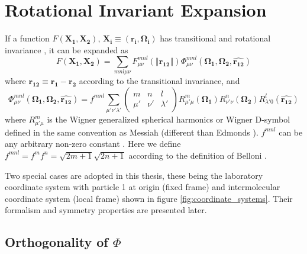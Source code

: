 
\chapter{Rotational Invariant Expansion\label{chpt:rotational-invariant-expansion}}

If a function $F(\mathbf{X_{1}},\mathbf{X_{2}})$, $\mathbf{X_{i}}\equiv(\mathbf{r_{i}},\mathbf{\Omega_{i}})$
has transitional and rotational invariance \citep{Blum_I}, it can
be expanded as
\begin{equation}
F(\mathbf{X_{1}},\mathbf{X_{2}})=\sum_{mnl\mu\nu}F_{\mu\nu}^{mnl}(\left\Vert \mathbf{r_{12}}\right\Vert )\Phi_{\mu\nu}^{mnl}(\mathbf{\Omega_{1}},\mathbf{\Omega_{2}},\mathbf{\hat{r_{12}}})\label{eq:pdf_on_rot_invar}
\end{equation}
where $\mathbf{r_{12}}\equiv\mathbf{r_{1}}-\mathbf{r_{2}}$ according
to the transitional invariance, and
\begin{equation}
\Phi_{\mu\nu}^{mnl}(\mathbf{\Omega_{1}},\mathbf{\Omega_{2}},\mathbf{\hat{r_{12}}})=f^{mnl}\sum_{\mu'\nu'\lambda'}\left(\begin{array}{ccc}
m & n & l\\
\mu' & \nu' & \lambda'
\end{array}\right)R_{\mu'\mu}^{m}(\mathbf{\Omega_{1}})R_{\nu'\nu}^{n}(\mathbf{\Omega_{2}})R_{\lambda'0}^{l}(\mathbf{\hat{r_{12}}})\label{eq:definition_rot_invar}
\end{equation}
where $R_{\mu'\mu}^{m}$ is the Wigner generalized spherical harmonics
or Wigner D-symbol defined in the same convention as Messiah \citep{Messiah}
(different than Edmonds \citep{Edmonds}). $f^{mnl}$ can be any arbitrary
non-zero constant \citep{Fries_Patey_1985}. Here we define $f^{mnl}=f^{m}f^{n}=\sqrt{2m+1}\sqrt{2n+1}$
according to the definition of Belloni \citep{Luc_2014}.

Two special cases are adopted in this thesis, these being the laboratory
coordinate system with particle 1 at origin (fixed frame) and intermolecular
coordinate system (local frame) shown in figure \ref{fig:coordinate_systems}.
Their formalism and symmetry properties are presented later.

\section{Orthogonality of $\Phi$}

